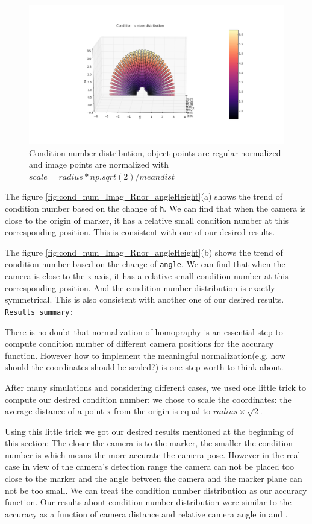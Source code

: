 \begin{figure}[H]
\hspace*{-4cm}
\centering
\includegraphics[scale=0.6]{./fig/cond_num_Imag_Rnor.png}
\caption{Condition number distribution, object points are regular normalized and image points are normalized with $scale = radius*np.sqrt(2) / meandist$}  
\label{fig:cond_num_Imag_Rnor}
\end{figure}

The figure \ref{fig:cond_num_Imag_Rnor_angleHeight}(a) shows the trend of condition number based on the change of \texttt{h}. We can find that when the camera is close to the origin of marker, it has a relative small condition number at this corresponding position. This is consistent with one of our desired results.

The figure \ref{fig:cond_num_Imag_Rnor_angleHeight}(b) shows the trend of condition number based on the change of \texttt{angle}. We can find that when the camera is close to the x-axis, it has a relative small condition number at this corresponding position. And the condition number distribution is exactly symmetrical. This is also consistent with another one of our desired results.\\

\texttt{Results summary:}

There is no doubt that normalization of homopraphy is an essential step to compute condition number of different camera positions for the accuracy function. However how to implement the meaningful normalization(e.g. how should the coordinates should be scaled?) is one step worth to think about.
 
After many simulations and considering different cases, we used one little trick to compute our desired condition number: we chose to scale the coordinates: the average distance of
a point x from the origin is equal to $radius \times \sqrt{2}$.

Using this little trick we got our desired results mentioned at the beginning of this section: 
The closer the camera is to the marker, the smaller the condition number is which means the more accurate the camera pose. However in the real case in view of the camera's detection range the camera can not be placed too close to the marker and the angle between the camera and the marker plane can not be too small. We can treat the condition number distribution as our accuracy function. Our results about condition number distribution were similar to the accuracy as a function of camera distance and relative camera angle in \cite{abawi2004accuracy} and \cite{pentenrieder2006analysis}.